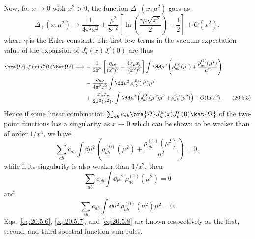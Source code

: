 Now, for $x\to0$ with $x^2>0$, the function $\Delta_+(x;\mu^2)$ goes as
\begin{equation}
\Delta_+(x;\mu^2)\longrightarrow
\frac{1}{4\pi^2x^2}
+\frac{\mu^2}{8\pi^2}
\left[
\ln\left(\frac{\gamma\mu\sqrt{x^2}}{2}\right)-\frac12
\right]
+O(x^2),
\tag{20.5.4}\label{eq:20.5.4}
\end{equation}
where $\gamma$ is the Euler constant. The first few terms in the vacuum expectation value of the expansion of $J_a^\mu(x)J_b^\nu(0)$ are thus
\begin{align}
\bra{\Omega}J_a^\mu(x)J_b^\nu(0)\ket{\Omega}
\longrightarrow{}&
-\frac{1}{2\pi^2}
\left[
\frac{\eta_{\mu\nu}}{(x^2)^2}
-\frac{4x_\mu x_\nu}{(x^2)^3}
\right]
\int \dd\mu^2
\left(
\rho_{ab}^{(0)}(\mu^2)
+\frac{\rho_{ab}^{(1)}(\mu^2)}{\mu^2}
\right)
\notag\\
&-\frac{\eta_{\mu\nu}}{4\pi^2x^2}
\int \dd\mu^2\,\rho_{ab}^{(0)}(\mu^2)\mu^2
\notag\\
&+\frac{x_\mu x_\nu}{2\pi^2(x^2)^2}
\int \dd\mu^2
\left(
\rho_{ab}^{(0)}(\mu^2)\mu^2
+\rho_{ab}^{(1)}(\mu^2)
\right)
+O(\ln x^2).
\tag{20.5.5}\label{eq:20.5.5}
\end{align}
Hence if some linear combination $\sum_{ab}c_{ab}\bra{\Omega}J_a^\mu(x)J_b^\nu(0)\ket{\Omega}$ of the two-point functions has a singularity as $x\to0$ which can be shown to be weaker than of order $1/x^4$, we have
\begin{equation}
\sum_{ab}c_{ab}
\int \dd\mu^2
\left(
\rho_{ab}^{(0)}(\mu^2)
+\frac{\rho_{ab}^{(1)}(\mu^2)}{\mu^2}
\right)=0,
\tag{20.5.6}\label{eq:20.5.6}
\end{equation}
while if its singularity is also weaker than $1/x^2$, then
\begin{equation}
\sum_{ab}c_{ab}
\int \dd\mu^2\,\rho_{ab}^{(1)}(\mu^2)=0
\tag{20.5.7}\label{eq:20.5.7}
\end{equation}
and
\begin{equation}
\sum_{ab}c_{ab}
\int \dd\mu^2\,\rho_{ab}^{(0)}(\mu^2)\mu^2=0.
\tag{20.5.8}\label{eq:20.5.8}
\end{equation}
Eqs.~\eqref{eq:20.5.6}, \eqref{eq:20.5.7}, and \eqref{eq:20.5.8} are known respectively as the first, second, and third spectral function sum rules.

